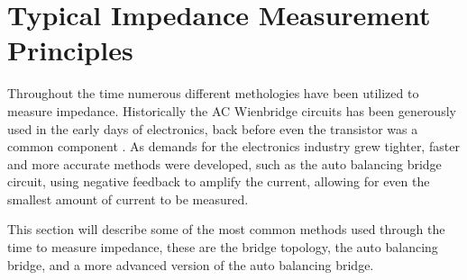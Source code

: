 \section{Typical Impedance Measurement Principles} \label{sec:TypicalMeasPrin}
Throughout the time numerous different methologies have been utilized to measure impedance. Historically the AC Wienbridge circuits has been generously used in the 
early days of electronics, back before even the transistor was a common component \cite{IET_LABS_LCR_PRINCIPLES}. As demands for the electronics industry grew tighter,
faster and more accurate methods were developed, such as the auto balancing bridge circuit, using negative feedback to amplify the current, allowing for even the
smallest amount of current to be measured.

This section will describe some of the most common methods used through the time to measure impedance, these are the bridge topology, the auto balancing bridge, and a more advanced version of the auto balancing bridge. 

